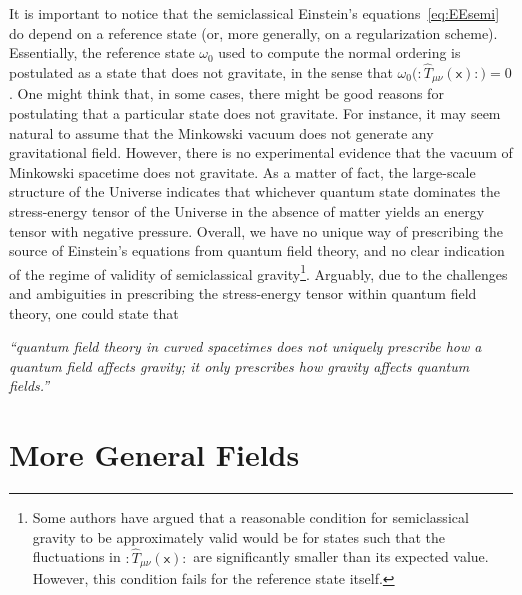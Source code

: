 \documentclass[letterpaper,12pt,titlepage,oneside,final]{book}
\newcommand{\normord}[1]{\vcentcolon\mathrel{#1}\vcentcolon}
\providecommand{\vcentcolon}{\mathrel{\mathop{:}}}
\newcommand{\mf}{\mathsf}%
\begin{document}
It is important to notice that the semiclassical Einstein's equations~\eqref{eq:EEsemi} do depend on a reference state (or, more generally, on a regularization scheme). Essentially, the reference state $\omega_0$ used to compute the normal ordering is postulated as a state that does not gravitate, in the sense that $\omega_0\big(\!\!\normord{\hat{T}_{\mu\nu}(\mf x)}\!\!\big)=0$. One might think that, in some cases, there might be good reasons for postulating that a particular state does not gravitate. For instance, it may seem natural to assume that the Minkowski vacuum does not generate any gravitational field. However, there is no experimental evidence that the vacuum of Minkowski spacetime does not gravitate. As a matter of fact, the large-scale structure of the Universe indicates that whichever quantum state dominates the stress-energy tensor of the Universe in the absence of matter yields an energy tensor with negative pressure. Overall, we have no unique way of prescribing the source of Einstein's equations from quantum field theory, and no clear indication of the regime of validity of semiclassical gravity\footnote{Some authors have argued that a reasonable condition for semiclassical gravity to be approximately valid would be for states such that the fluctuations in $\normord{\hat{T}_{\mu\nu}(\mf x)}$ are significantly smaller than its expected value. However, this condition fails for the reference state itself.}. Arguably, due to the challenges and ambiguities in prescribing the stress-energy tensor within quantum field theory, one could state that

\begin{center}
\textit{``quantum field theory in curved spacetimes does not uniquely prescribe how a quantum field affects gravity; it only prescribes how gravity affects quantum fields.''}
\end{center}












\section{More General Fields}\label{sec:generalQFT}
\end{document}
